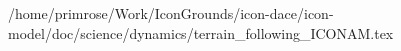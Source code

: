 /home/primrose/Work/IconGrounds/icon-dace/icon-model/doc/science/dynamics/terrain_following_ICONAM.tex
